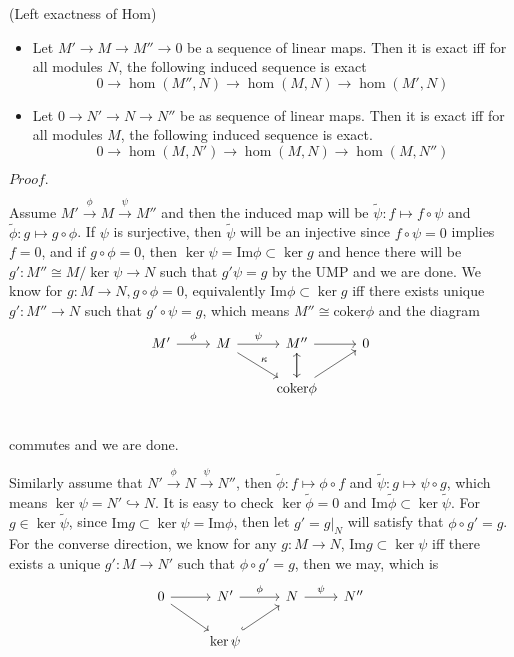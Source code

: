 \documentclass{article}
\newcommand{\Pf}[1]{$Proof.$\par}
\begin{document}
    \begin{theorem}
        (Left exactness of Hom)\par
        \begin{itemize}
            \item Let $M' \to M \to M'' \to 0$ be a sequence of linear maps. Then it is exact iff for all modules $N$, the following induced sequence is exact
            \[0 \to \hom(M'',N) \to \hom(M,N) \to \hom(M',N)\]
            \item Let $0\to N' \to N \to N''$ be as sequence of linear maps. Then it is exact iff for all modules $M$, the following induced sequence is exact.
            \[0 \to \hom(M,N') \to \hom(M,N) \to \hom(M,N'')\]
        \end{itemize}
    \end{theorem}
    \Pf\par
        Assume $M'\overset{\phi}{\to} M \overset{\psi}{\to} M''$ and then the induced map will be $\tilde{\psi}: f\mapsto f\circ \psi$ and $\tilde{\phi}:g\mapsto g\circ \phi$. If $\psi$ is surjective, then $\tilde{\psi}$ will be an injective since $f\circ\psi = 0$ implies $f = 0$, and if $g\circ\phi = 0$, then $ \ker \psi = \text{Im} \phi \subset \ker{g}$ and hence there will be $g':M'' \cong M/\ker\psi \to N$ such that $g'\psi = g$ by the UMP and we are done. We know for $g:M \to N, g\circ \phi = 0$, equivalently  $\text{Im}\phi \subset \ker g$ iff there exists unique $g':M''\to N$ such that $g' \circ \psi = g$, which means $M''\cong \text{coker}\phi$ and the diagram
        \[
        \begin{tikzcd}
            M'\arrow[r,"\phi"] & M\arrow[r,"\psi"]\arrow[rd,"\kappa"] & M''\arrow[d]\arrow[r] & 0 \\
            & & \text{coker}\phi\arrow[u]\arrow[ru] & \\
        \end{tikzcd}
        \]
        commutes and we are done.\par
        Similarly assume that $N'\overset{\phi}{\to} N \overset{\psi}{\to} N''$, then $\tilde{\phi}: f\mapsto \phi\circ f$ and $\tilde{\psi}: g\mapsto \psi\circ g$, which means $\ker\psi = N'\hookrightarrow N$. It is easy to check $\ker\tilde{\phi} = 0$ and $\text{Im}\tilde{\phi} \subset \ker\tilde{\psi}$. For $g\in\ker \tilde{\psi}$, since $\text{Im}g \subset \ker\psi = \text{Im}\phi$, then let $g' = g|_N$ will satisfy that $\phi\circ g' = g$. For the converse direction, we know for any $g:M\to N$, $\text{Im}g\subset \ker\psi$ iff there exists a unique $g':M\to N'$ such that $\phi \circ g' = g$, then we may, which is 
        \[
        \begin{tikzcd}
            0\arrow[r]\arrow[rd] & N'\arrow[r,"\phi"] & N\arrow[r,"\psi"] & N'' \\
              & \ker\psi\arrow[hookrightarrow]{ru} & & \\
        \end{tikzcd}
        \]
\end{document}
